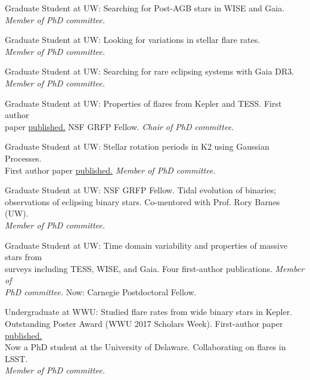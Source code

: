 

Graduate Student at UW: Searching for Post-AGB stars in WISE and Gaia.\\
{\it Member of PhD committee.}


Graduate Student at UW: Looking for variations in stellar flare rates.\\
{\it Member of PhD committee.}


Graduate Student at UW: Searching for rare eclipsing systems with Gaia DR3.\\ 
{\it Member of PhD committee.}


Graduate Student at UW: Properties of flares from Kepler and TESS. First author \\paper \href{https://arxiv.org/abs/2205.05706}{\color{NavyBlue}published.}
NSF GRFP Fellow. {\it Chair of PhD committee.}


Graduate Student at UW: Stellar rotation periods in K2 using Gaussian Processes. \\First author paper \href{https://arxiv.org/abs/2101.07886}{\color{NavyBlue}published.} {\it Member of PhD committee.}

Graduate Student at UW: NSF GRFP Fellow. Tidal evolution of binaries; \\observations of eclipsing binary stars. Co-mentored with Prof. Rory Barnes (UW). \\{\it Member of PhD committee.}

Graduate Student at UW: Time domain variability and properties of massive stars from \\surveys including TESS, WISE, and Gaia. Four first-author publications. {\it Member of \\PhD committee.} Now: Carnegie Postdoctoral Fellow.


Undergraduate at WWU: Studied flare rates from wide binary stars in Kepler. \\Outstanding Poster Award (WWU 2017 Scholars Week). First-author paper \href{https://arxiv.org/abs/1712.04570}{\color{NavyBlue} published.}\\
Now a PhD student at the University of Delaware. Collaborating on flares in LSST. \\  {\it Member of PhD committee.}

